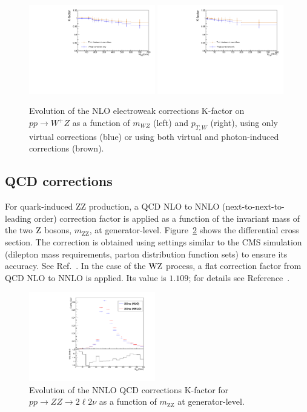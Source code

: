 \begin{figure}[!bhtp]
  \centering
  \includegraphics[width=0.49\textwidth]{figures/WZ_NLOEW_mWZ_ULB.pdf}
  \includegraphics[width=0.49\textwidth]{figures/WZ_NLOEW_pTW_ULB.pdf}
  \caption{Evolution of the NLO electroweak corrections K-factor on $pp \to W^+Z$ as a function of $m_{WZ}$ (left) and $p_{T,W}$ (right), using only virtual corrections (blue) or using both virtual and photon-induced corrections (brown).
  \label{fig:gammaInduced_WZ}}
\end{figure}

\clearpage
\subsection{QCD corrections}
For quark-induced ZZ production, a QCD NLO to NNLO (next-to-next-to-leading order)
correction factor is applied as a function of the invariant mass of the two $\mathrm{Z}$ bosons,
$m_\mathrm{ZZ}$, at generator-level.
Figure~\ref{fig:NNLO_QCD_corrections} shows the differential cross section.
The correction is obtained using settings similar to the CMS simulation (dilepton mass requirements,
parton distribution function sets) to ensure its accuracy. See Ref.~\cite{Grazzini:2015hta}.
In the case of the $\mathrm{W}\mathrm{Z}$ process, a flat correction factor from QCD NLO to NNLO is applied.
Its value is $\mathbf{1.109}$; for details see Reference~\cite{Grazzini:2016swo}.


\begin{figure}[htp]
  \centering
  \includegraphics[width=0.49\textwidth]{figures/ZZ_NNLO_QCD_corrections.pdf} 
  \caption{Evolution of the NNLO QCD corrections K-factor for $pp \to ZZ \to 2\ell2\nu$ as a function of $m_\mathrm{ZZ}$ at generator-level.} 
  \label{fig:NNLO_QCD_corrections}
\end{figure} 

